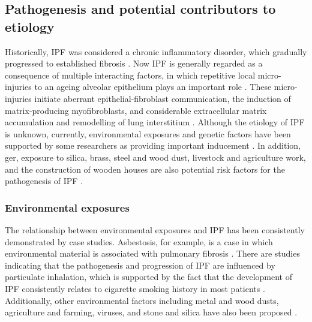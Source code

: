 \subsection{Pathogenesis and potential contributors to etiology}
Historically, IPF was considered a chronic inflammatory disorder, which gradually progressed to established fibrosis \citep{richeldi2017idiopathic}. Now IPF is generally regarded as a consequence of multiple interacting factors, in which repetitive local micro-injuries to an ageing alveolar epithelium plays an important role \citep{richeldi2017idiopathic}. These micro-injuries initiate aberrant epithelial-fibroblast communication, the induction of matrix-producing myofibroblasts, and considerable extracellular matrix accumulation and remodelling of lung interstitium \citep{richeldi2017idiopathic}. Although the etiology of IPF is unknown, currently,  environmental exposures and genetic factors have been supported by some researchers as providing important inducement \citep{taskar2006idiopathic,meltzer2008idiopathic,xaubet2017idiopathic,richeldi2017idiopathic}. In addition, \gls{ger}, exposure to silica, brass, steel and wood dust, livestock and agriculture work, and the construction of wooden houses are also potential risk factors for the pathogenesis of IPF \citep{taskar2006idiopathic,xaubet2017idiopathic}.

\subsubsection{Environmental exposures}
The relationship between environmental exposures and IPF has been consistently demonstrated by case studies. Asbestosis, for example, is a case in which environmental material is associated with pulmonary fibrosis \citep{meltzer2008idiopathic}. There are studies indicating that the pathogenesis and progression of IPF are influenced by particulate inhalation, which is supported by the fact that the development of IPF consistently relates to cigarette smoking history in most patients \citep{baumgartner1997cigarette,richeldi2017idiopathic}. Additionally, other environmental factors including metal and wood dusts, agriculture and farming, viruses, and stone and silica have also been proposed \citep{raghu2011official, taskar2006idiopathic}.

\newpage

